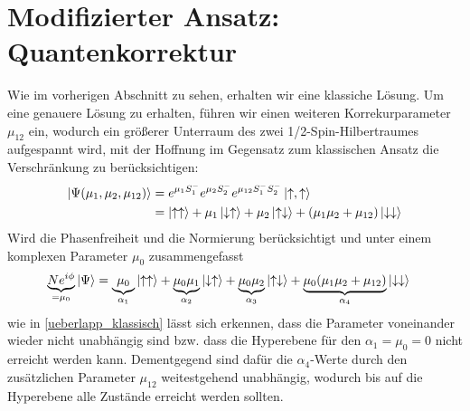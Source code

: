 



\section{Modifizierter Ansatz: Quantenkorrektur}
\noindent Wie im vorherigen Abschnitt zu sehen, erhalten wir eine klassiche Lösung. Um eine genauere Lösung zu erhalten, 
führen wir einen weiteren Korrekurparameter $\mu_{12}$ ein, wodurch ein größerer Unterraum des zwei 1/2-Spin-Hilbertraumes aufgespannt 
wird, mit der Hoffnung im Gegensatz zum klassischen Ansatz die Verschränkung zu berücksichtigen:
\begin{align}
    \ket{\Psi(\mu_1,\mu_2,\mu_{12})} &= e^{\mu_1 S_1^-}e^{\mu_2 S_2^-}e^{\mu_{12} S_1^-S_2^-}\ket{\uparrow,\uparrow}\\
                                    &= \ket{\uparrow \uparrow} +\mu_1\ket{\downarrow \uparrow} + \mu_2\ket{\uparrow \downarrow} + (\mu_1\mu_2 + \mu_{12})\ket{\downarrow \downarrow}
\end{align}
Wird  die Phasenfreiheit und die Normierung berücksichtigt und unter einem komplexen Parameter $\mu_0$ zusammengefasst
\begin{align}
    \underbrace{Ne^{i\phi}}_{=\mu_0}\ket{\Psi} &= \underbrace{\mu_0}_{\alpha_1}\ket{\uparrow \uparrow} 
    + \underbrace{\mu_0\mu_1}_{\alpha_2}\ket{\downarrow \uparrow} + \underbrace{\mu_0\mu_2}_{\alpha_3}\ket{\uparrow \downarrow} 
    + \underbrace{\mu_0(\mu_1\mu_2 + \mu_{12})}_{\alpha_4}\ket{\downarrow\downarrow}
\end{align}
wie in \autoref{ueberlapp_klassisch} lässt sich erkennen, dass die Parameter voneinander wieder nicht unabhängig sind bzw. dass die 
Hyperebene für den $\alpha_1 = \mu_0 = 0$ nicht erreicht werden kann. Dementgegend sind dafür die $\alpha_4$-Werte durch den zusätzlichen 
Parameter $\mu_{12}$ weitestgehend unabhängig, wodurch bis auf die Hyperebene alle Zustände erreicht werden sollten.    

